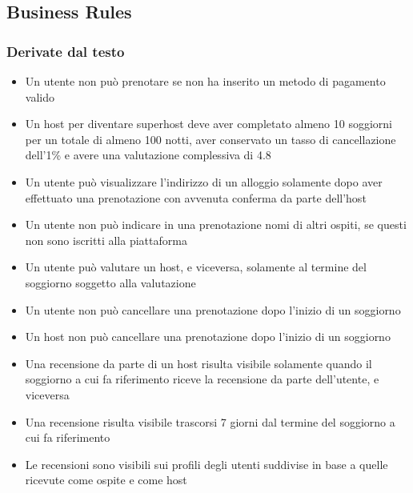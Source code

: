 \subsection{Business Rules}
\subsubsection{Derivate dal testo}
\begin{itemize}
  \item Un utente non può prenotare se non ha inserito un metodo di pagamento valido
  \item Un host per diventare superhost deve aver completato almeno 10 soggiorni per un totale di almeno 100 notti, aver conservato un tasso di cancellazione dell'1\% e avere una valutazione complessiva di 4.8 
  \item Un utente può visualizzare l'indirizzo di un alloggio solamente dopo aver effettuato una prenotazione con avvenuta conferma da parte dell'host
  \item Un utente non può indicare in una prenotazione nomi di altri ospiti, se questi non sono iscritti alla piattaforma 
  \item Un utente può valutare un host, e viceversa, solamente al termine del soggiorno soggetto alla valutazione
  \item Un utente non può cancellare una prenotazione dopo l'inizio di un soggiorno
  \item Un host non può cancellare una prenotazione dopo l'inizio di un soggiorno
  \item Una recensione da parte di un host risulta visibile solamente quando il soggiorno a cui fa riferimento riceve la recensione da parte dell'utente, e viceversa
  \item Una recensione risulta visibile trascorsi 7 giorni dal termine del soggiorno a cui fa riferimento
  \item Le recensioni sono visibili sui profili degli utenti suddivise in base a quelle ricevute come ospite e come host
\end{itemize}

